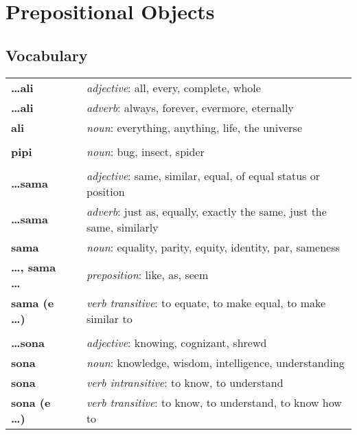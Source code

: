 \section{Prepositional Objects}
%
\subsection*{Vocabulary}
%
\begin{supertabular}{p{2,5cm}|ll}
%
\textbf{\dots ali} && \textit{adjective}: all, every, complete, whole \\ %
\textbf{\dots ali} && \textit{adverb}: always, forever, evermore, eternally \\ %
\textbf{ali} && \textit{noun}: everything, anything, life, the universe \\ %
 && \\ %
%
\textbf{pipi} && \textit{noun}: bug, insect, spider \\ %
 && \\ %
%
\textbf{\dots sama} && \textit{adjective}: same, similar, equal, of equal status or position \\ %
\textbf{\dots sama} && \textit{adverb}: just as, equally, exactly the same, just the same, similarly \\ %
\textbf{sama} && \textit{noun}: equality, parity, equity, identity, par, sameness \\ %
\textbf{\dots , sama \dots} && \textit{preposition}: like, as, seem \\ %
\textbf{sama (e \dots)} && \textit{verb transitive}: to equate, to make equal, to make similar to \\ %
 && \\ %
%
\textbf{\dots sona} && \textit{adjective}: knowing, cognizant, shrewd \\ %
\textbf{sona} && \textit{noun}: knowledge, wisdom, intelligence, understanding \\ %
\textbf{sona} && \textit{verb intransitive}: to know, to understand \\ %
\textbf{sona (e \dots)} && \textit{verb transitive}: to know, to understand, to know how to \\ %

\end{supertabular}

